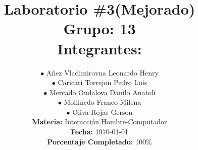 
\newcommand{\NumeroLaboratorio}{3}		%
\newcommand{\PorcentajeCompletado}{100}	%





\title{
\hspace{-0.1cm}\LARGE{Laboratorio \#\NumeroLaboratorio (Mejorado)} \\\vspace{0.05cm}
{\large Grupo: 13} \\\vspace{0.2cm}
{\large Integrantes:} \\\vspace{0.2cm}
}

\author{
\hspace{0.5cm}$\bullet$ Añez Vladimirovna Leonardo Henry\\
\hspace{0.5cm}$\bullet$ Caricari Torrejon Pedro Luis\\
\hspace{0.5cm}$\bullet$ Mercado Oudalova Danilo Anatoli\\
\hspace{0.5cm}$\bullet$ Mollinedo Franco Milena\\
\hspace{0.5cm}$\bullet$ Oliva Rojas Gerson \\\vspace{0.2cm}
\textbf{Materia:} Interacción Hombre-Computador \\\vspace{0.2cm}
\textbf{Fecha:} \today \\\vspace{0.2cm}
\textbf{Porcentaje Completado:} \PorcentajeCompletado$\%$
}
\maketitle
